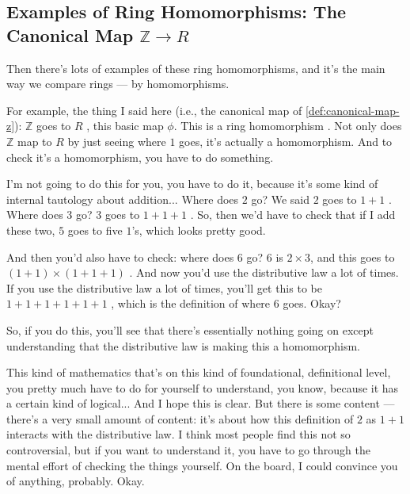 \subsection{Examples of Ring Homomorphisms: The Canonical Map \texorpdfstring{$\mathbb{Z} \to R$}{Z -> R}}

\begin{speech}[00:25:08 - 00:27:20]
Then there's lots of examples  of these ring homomorphisms, and it's the main way we compare rings --- by homomorphisms.

For example, the thing I said here (i.e., the canonical map of \cref{def:canonical-map-z}): $\mathbb{Z}$ goes to $R$ , this basic map $\phi$. This is a ring homomorphism . Not only does $\mathbb{Z}$ map to $R$ by just seeing where $1$ goes, it's actually a homomorphism. And to check it's a homomorphism, you have to do something.

I'm not going to do this for you, you have to do it, because it's some kind of internal tautology about addition... Where does $2$ go? We said $2$ goes to $1 + 1$ . Where does $3$ go? $3$ goes to $1 + 1 + 1$ . So, then we'd have to check that if I add these two, $5$ goes to five $1$'s, which looks pretty good.

And then you'd also have to check: where does $6$ go? $6$ is $2 \times 3$, and this goes to $(1+1) \times (1+1+1)$ . And now you'd use the distributive law a lot of times. If you use the distributive law a lot of times, you'll get this to be $1 + 1 + 1 + 1 + 1 + 1$ , which is the definition of where $6$ goes. Okay?

So, if you do this, you'll see that there's essentially nothing going on except understanding that the distributive law is making this a homomorphism.

This kind of mathematics that's on this kind of foundational, definitional level, you pretty much have to do for yourself to understand, you know, because it has a certain kind of logical... And I hope this is clear. But there is some content --- there's a very small amount of content: it's about how this definition of $2$ as $1+1$ interacts with the distributive law. I think most people find this not so controversial, but if you want to understand it, you have to go through the mental effort of checking the things yourself. On the board, I could convince you of anything, probably. Okay.
\end{speech}

